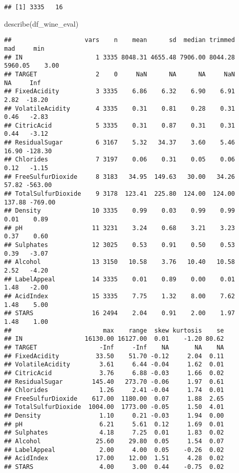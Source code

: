 \documentclass[
]{article}
\newenvironment{Shaded}{\begin{snugshade}}{\end{snugshade}}
\newcommand{\FunctionTok}[1]{\textcolor[rgb]{0.00,0.00,0.00}{#1}}
\newcommand{\NormalTok}[1]{#1}
\begin{document}
\begin{verbatim}
## [1] 3335   16
\end{verbatim}

\begin{Shaded}
\begin{Highlighting}[]
\FunctionTok{describe}\NormalTok{(df\_wine\_eval)}
\end{Highlighting}
\end{Shaded}

\begin{verbatim}
##                    vars    n    mean      sd  median trimmed     mad     min
## IN                    1 3335 8048.31 4655.48 7906.00 8044.28 5960.05    3.00
## TARGET                2    0     NaN      NA      NA     NaN      NA     Inf
## FixedAcidity          3 3335    6.86    6.32    6.90    6.91    2.82  -18.20
## VolatileAcidity       4 3335    0.31    0.81    0.28    0.31    0.46   -2.83
## CitricAcid            5 3335    0.31    0.87    0.31    0.31    0.44   -3.12
## ResidualSugar         6 3167    5.32   34.37    3.60    5.46   16.90 -128.30
## Chlorides             7 3197    0.06    0.31    0.05    0.06    0.12   -1.15
## FreeSulfurDioxide     8 3183   34.95  149.63   30.00   34.26   57.82 -563.00
## TotalSulfurDioxide    9 3178  123.41  225.80  124.00  124.00  137.88 -769.00
## Density              10 3335    0.99    0.03    0.99    0.99    0.01    0.89
## pH                   11 3231    3.24    0.68    3.21    3.23    0.37    0.60
## Sulphates            12 3025    0.53    0.91    0.50    0.53    0.39   -3.07
## Alcohol              13 3150   10.58    3.76   10.40   10.58    2.52   -4.20
## LabelAppeal          14 3335    0.01    0.89    0.00    0.01    1.48   -2.00
## AcidIndex            15 3335    7.75    1.32    8.00    7.62    1.48    5.00
## STARS                16 2494    2.04    0.91    2.00    1.97    1.48    1.00
##                         max    range  skew kurtosis    se
## IN                 16130.00 16127.00  0.01    -1.20 80.62
## TARGET                 -Inf     -Inf    NA       NA    NA
## FixedAcidity          33.50    51.70 -0.12     2.04  0.11
## VolatileAcidity        3.61     6.44 -0.04     1.62  0.01
## CitricAcid             3.76     6.88 -0.03     1.66  0.02
## ResidualSugar        145.40   273.70 -0.06     1.97  0.61
## Chlorides              1.26     2.41 -0.04     1.74  0.01
## FreeSulfurDioxide    617.00  1180.00  0.07     1.88  2.65
## TotalSulfurDioxide  1004.00  1773.00 -0.05     1.50  4.01
## Density                1.10     0.21 -0.03     1.94  0.00
## pH                     6.21     5.61  0.12     1.69  0.01
## Sulphates              4.18     7.25  0.01     1.83  0.02
## Alcohol               25.60    29.80  0.05     1.54  0.07
## LabelAppeal            2.00     4.00  0.05    -0.26  0.02
## AcidIndex             17.00    12.00  1.51     4.28  0.02
## STARS                  4.00     3.00  0.44    -0.75  0.02
\end{verbatim}
\end{document}
